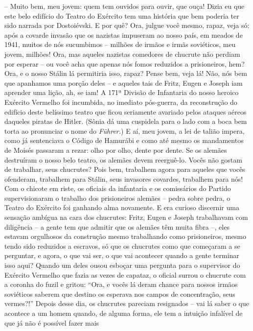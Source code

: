 -- Muito bem, meu jovem: quem tem ouvidos para ouvir, que ouça! Dizia eu
que este belo edifício do Teatro do Exército tem uma história que bem
poderia ter sido narrada por Dostoiévski. E por quê? Ora, julgue você
mesmo, rapaz, veja só: após a covarde invasão que os nazistas impuseram
ao nosso país, em meados de 1941, muitos de nós sucumbimos -- milhões de
irmãos e irmãs soviéticos, meu jovem, milhões! Ora, mas aqueles nazistas
comedores de chucrute não perdiam por esperar -- ou você acha que apenas
nós fomos reduzidos a prisioneiros, hem? Ora, e o nosso Stálin lá
permitiria isso, rapaz? Pense bem, veja lá! Não, nós bem que apanhamos
uma porção deles -- e aqueles tais de Fritz, Eugen e Joseph iam aprender
uma lição, ah, se iam! A 171ª Divisão de Infantaria do nosso heroico
Exército Vermelho foi incumbida, no imediato pós-guerra, da reconstrução
do edifício deste belíssimo teatro que ficou seriamente avariado pelos
ataques aéreos daqueles piratas de Hitler. (Sônia dá uma cuspidela para
o lado com a boca bem torta ao pronunciar o nome do \emph{Führer.}) E
aí, meu jovem, a lei de talião impera, como já sentenciava o Código de
Hamurábi e como até mesmo os mandamentos de Moisés passaram a rezar:
olho por olho, dente por dente. Se os alemães destruíram o nosso belo
teatro, os alemães devem reerguê-lo. Vocês não gostam de trabalhar, seus
chucrutes? Pois bem, trabalhem agora para aqueles que vocês ofenderam,
trabalhem para Stálin, seus invasores covardes, trabalhem para nós! Com
o chicote em riste, os oficiais da infantaria e os comissários do
Partido supervisionaram o trabalho dos prisioneiros alemães -- pedra
sobre pedra, o Teatro do Exército foi ganhando alma novamente. E era
curioso discernir uma sensação ambígua na cara dos chucrutes: Fritz,
Eugen e Joseph trabalhavam com diligência -- a gente tem que admitir que
os alemães têm muita fibra --, eles estavam orgulhosos da construção
mesmo trabalhando como prisioneiros, mesmo tendo sido reduzidos a
escravos, só que os chucrutes como que começaram a se perguntar, e
agora, o que vai ser, o que vai acontecer quando a gente terminar isso
aqui? Quando um deles ousou esboçar uma pergunta para o supervisor do
Exército Vermelho que fazia as vezes de capataz, o oficial surrou o
chucrute com a coronha do fuzil e gritou: ``Ora, e vocês lá deram chance
para nossos irmãos soviéticos saberem que destino os esperava nos campos
de concentração, seus vermes?!'' Depois desse dia, os chucrutes pareciam
resignados -- vai lá saber o que acontece a um homem quando, de alguma
forma, ele tem a intuição infalível de que já não é possível fazer mais
